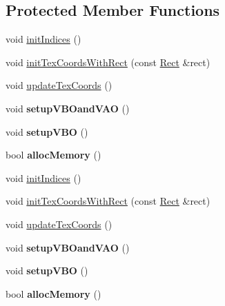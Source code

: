 \subsection*{Protected Member Functions}
\begin{DoxyCompactItemize}
\item 
void \hyperlink{classParticleSystemQuad_a2ac478715f93de7487ebe9f228b7c065}{init\+Indices} ()
\item 
void \hyperlink{classParticleSystemQuad_ac43c6847db3e8d44e422564496c94db3}{init\+Tex\+Coords\+With\+Rect} (const \hyperlink{classRect}{Rect} \&rect)
\item 
void \hyperlink{classParticleSystemQuad_a74aafec2dfe389284d94d6694c4a7de5}{update\+Tex\+Coords} ()
\item 
\mbox{\label{classParticleSystemQuad_ad6c5810583d6336fad1c7856fb2feb2a}} 
void {\bfseries setup\+V\+B\+Oand\+V\+AO} ()
\item 
\mbox{\label{classParticleSystemQuad_afd0bcae10f6252a0f0d26952eaac6549}} 
void {\bfseries setup\+V\+BO} ()
\item 
\mbox{\label{classParticleSystemQuad_a1f0f3990dcad581e5f582355945ea051}} 
bool {\bfseries alloc\+Memory} ()
\item 
void \hyperlink{classParticleSystemQuad_a2ac478715f93de7487ebe9f228b7c065}{init\+Indices} ()
\item 
void \hyperlink{classParticleSystemQuad_ac43c6847db3e8d44e422564496c94db3}{init\+Tex\+Coords\+With\+Rect} (const \hyperlink{classRect}{Rect} \&rect)
\item 
void \hyperlink{classParticleSystemQuad_a74aafec2dfe389284d94d6694c4a7de5}{update\+Tex\+Coords} ()
\item 
\mbox{\label{classParticleSystemQuad_ad6c5810583d6336fad1c7856fb2feb2a}} 
void {\bfseries setup\+V\+B\+Oand\+V\+AO} ()
\item 
\mbox{\label{classParticleSystemQuad_afd0bcae10f6252a0f0d26952eaac6549}} 
void {\bfseries setup\+V\+BO} ()
\item 
\mbox{\label{classParticleSystemQuad_a1f0f3990dcad581e5f582355945ea051}} 
bool {\bfseries alloc\+Memory} ()
\end{DoxyCompactItemize}
